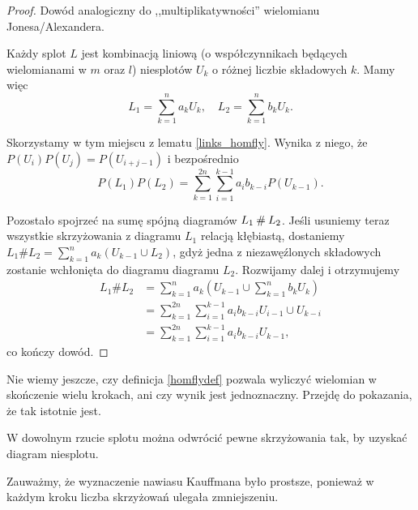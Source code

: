 \begin{proof}
    Dowód analogiczny do ,,multiplikatywności'' wielomianu Jonesa/Alexandera.

    Każdy splot $L$ jest kombinacją liniową (o współczynnikach będących wielomianami w $m$ oraz $l$) niesplotów $U_k$ o różnej liczbie składowych $k$.
    Mamy więc
    \[
        L_1 = \sum_{k=1}^n a_k U_k, \quad
        L_2 = \sum_{k=1}^n b_k U_k.
    \]

    Skorzystamy w tym miejscu z lematu \ref{links_homfly}.
    Wynika z niego, że $P(U_i)P(U_j) = P(U_{i+j-1})$ i bezpośrednio
    \[
        P(L_1)P(L_2) = \sum_{k=1}^{2n} \sum_{i=1}^{k-1} a_i b_{k-i}P(U_{k-1}).
    \]

    Pozostało spojrzeć na sumę spójną diagramów  $L_1 \mathbin{\#} L_2$.
    Jeśli usuniemy teraz wszystkie skrzyżowania z diagramu $L_1$ relacją kłębiastą, dostaniemy $L_1 \# L_2 = \sum_{k=1}^n a_k (U_{k-1} \cup L_2)$, gdyż jedna z niezawęźlonych składowych zostanie wchłonięta do diagramu diagramu $L_2$.
    Rozwijamy dalej i otrzymujemy
    \begin{align*}
        L_1 \# L_2 & = \sum_{k=1}^n a_k \left(U_{k-1} \cup \sum_{k=1}^n b_k U_k\right) \\
                   & = \sum_{k=1}^{2n} \sum_{i=1}^{k-1} a_i b_{k-i} U_{i-1} \cup U_{k-i} \\
                   & = \sum_{k=1}^{2n} \sum_{i=1}^{k-1} a_i b_{k-i} U_{k-1},
    \end{align*}
    co kończy dowód.
\end{proof}

Nie wiemy jeszcze, czy definicja \ref{homflydef} pozwala wyliczyć wielomian w skończenie wielu krokach, ani czy wynik jest jednoznaczny.
Przejdę do pokazania, że tak istotnie jest.

\begin{lemma}
    W dowolnym rzucie splotu można odwrócić pewne skrzyżowania tak, by uzyskać diagram niesplotu.
\end{lemma}

Zauważmy, że wyznaczenie nawiasu Kauffmana było prostsze, ponieważ w każdym kroku liczba skrzyżowań ulegała zmniejszeniu.

